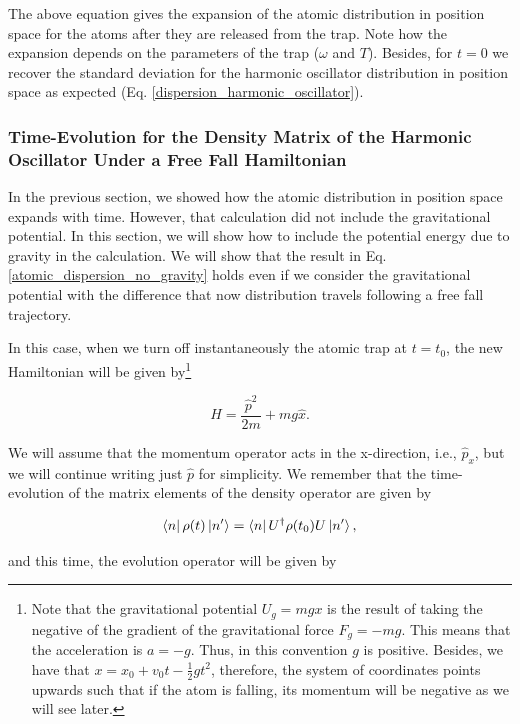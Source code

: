 \documentclass{article}
\begin{document}
The above equation gives the expansion of the atomic distribution in position space for the atoms after they are released from the trap. Note how the expansion depends on the parameters of the trap ($\omega$ and $T$). Besides, for $t=0$ we recover the standard deviation for the harmonic oscillator distribution in position space as expected (Eq. \ref{dispersion_harmonic_oscillator}).

\subsubsection{Time-Evolution for the Density Matrix of the Harmonic Oscillator Under a Free Fall Hamiltonian}
In the previous section, we showed how the atomic distribution in position space expands with time. However, that calculation did not include the gravitational potential. In this section, we will show how to include the potential energy due to gravity in the calculation. We will show that the result in Eq. \ref{atomic_dispersion_no_gravity} holds even if we consider the gravitational potential with the difference that now distribution travels following a free fall trajectory.

In this case, when we turn off instantaneously the atomic trap at $t=t_{0}$, the new Hamiltonian will be given by\footnote{Note that the gravitational potential $U_{g}=mgx$ is the result of taking the negative of the gradient of the gravitational force $F_{g}=-mg$. This means that the acceleration is $a=-g$. Thus, in this convention $g$ is positive. Besides, we have that $x=x_{0}+v_{0}t-\frac{1}{2}gt^{2}$, therefore, the system of coordinates points upwards such that if the atom is falling, its momentum will be negative as we will see later.}

\begin{equation}\label{free_fall_hamiltonian}
    H = \frac{\hat{p}^{2}}{2m} + mg\hat{x}.
\end{equation}

We will assume that the momentum operator acts in the x-direction, i.e., $\hat{p}_{x}$, but we will continue writing just $\hat{p}$ for simplicity.
We remember that the time-evolution of the matrix elements of the density operator are given by

\begin{equation}
    \bra{n} \rho (t) \ket{n'} = \bra{n} U^{\dagger} \rho (t_{0}) U \ket{n'},
\end{equation}

and this time, the evolution operator will be given by
\end{document}
